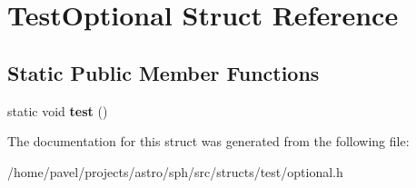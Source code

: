 \hypertarget{structTestOptional}{}\section{Test\+Optional Struct Reference}
\label{structTestOptional}
\subsection*{Static Public Member Functions}
\begin{DoxyCompactItemize}
\item 
\hypertarget{structTestOptional_aec3b21bdc87e9e44a2e8c4a021528fa9}{}\label{structTestOptional_aec3b21bdc87e9e44a2e8c4a021528fa9} 
static void {\bfseries test} ()
\end{DoxyCompactItemize}


The documentation for this struct was generated from the following file\+:\begin{DoxyCompactItemize}
\item 
/home/pavel/projects/astro/sph/src/structs/test/optional.\+h\end{DoxyCompactItemize}
